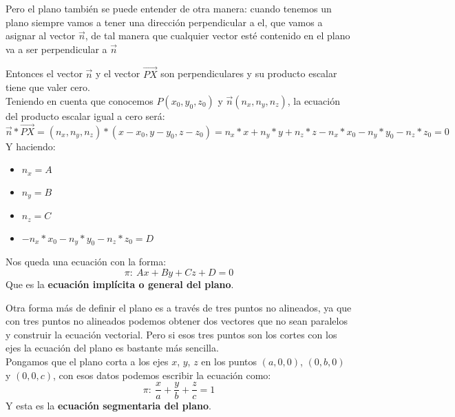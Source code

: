 \documentclass[a4paper,11pt,answers]{exam}
\begin{document}
Pero el plano también se puede entender de otra manera: cuando tenemos un plano siempre vamos a tener una dirección perpendicular a el, que vamos a asignar al vector $\vec{n}$, de tal manera que cualquier vector esté contenido en el plano va a ser perpendicular a $\vec{n}$
\begin{center}
\end{center}
Entonces el vector $\vec{n}$ y el vector $\overrightarrow{PX}$ son perpendiculares y su producto escalar tiene que valer cero.\\
Teniendo en cuenta que conocemos $P(x_0, y_0, z_0)$ y $\vec{n} (n_x, n_y, n_z)$, la ecuación del producto escalar igual a cero será:
\[\vec{n} *\overrightarrow{PX} = (n_x, n_y, n_z) * (x-x_0, y-y_0, z-z_0) =
n_x*x + n_y*y + n_z*z - n_x*x_0 - n_y*y_0 - n_z*z_0 = 0\]
Y haciendo:
\begin{itemize}
	\item $n_x = A$
	\item $n_y = B$
	\item $n_z = C$
	\item $- n_x*x_0 - n_y*y_0 - n_z*z_0 = D$
\end{itemize}
Nos queda una ecuación con la forma:
\[\pi:\ Ax + By + Cz + D = 0\]
Que es la \textbf{ecuación implícita o general del plano}.


Otra forma más de definir el plano es a través de tres puntos no alineados, ya que con tres puntos no alineados podemos obtener dos vectores que no sean paralelos y construir la ecuación vectorial. Pero si esos tres puntos son los cortes con los ejes la ecuación del plano es bastante más sencilla.\\
Pongamos que el plano corta a los ejes $x$, $y$, $z$ en los puntos $(a, 0, 0)$, $(0,b,0)$ y $(0,0,c)$, con esos datos podemos escribir la ecuación como:
\[\pi:\  \frac{x}{a} + \frac{y}{b} + \frac{z}{c} = 1\]
Y esta es la \textbf{ecuación segmentaria del plano}.\\
\end{document}
